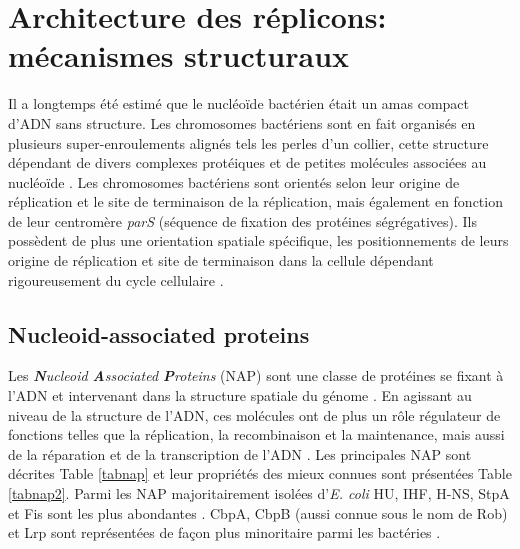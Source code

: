 \section{Architecture des réplicons: mécanismes structuraux}\label{spatial}
	Il a longtemps été estimé que le nucléoïde bactérien était un amas compact d'ADN sans structure. Les chromosomes bactériens sont en fait organisés en plusieurs super-enroulements alignés tels les perles d'un collier, cette structure dépendant de divers complexes protéiques et de petites molécules associées au nucléoïde \citep{thanbichler2010}. Les chromosomes bactériens sont orientés selon leur origine de réplication et le site de terminaison de la réplication, mais également en fonction de leur centromère \textit{parS} (séquence de fixation des protéines ségrégatives). Ils possèdent de plus une orientation spatiale spécifique, les positionnements de leurs origine de réplication et site de terminaison dans la cellule dépendant rigoureusement du cycle cellulaire \citep{Toro2010}.\\

	
\subsection{Nucleoid-associated proteins}  
	Les \textit{\textbf{N}ucleoid \textbf{A}ssociated \textbf{P}roteins} (NAP) sont une classe de protéines se fixant à l'ADN et intervenant dans la structure spatiale du génome \citep{Dillon2010}. En agissant au niveau de la structure de l'ADN, ces molécules ont de plus un rôle régulateur de fonctions telles que la réplication, la recombinaison et la maintenance, mais aussi de la réparation et de la transcription de l'ADN \citep{azam1999twelve}. Les principales NAP sont décrites Table \ref{tabnap} et leur propriétés des mieux connues sont présentées Table \ref{tabnap2}. Parmi les NAP majoritairement isolées d'\textit{E. coli} HU, IHF, H-NS, StpA et Fis sont les plus abondantes \citep{Johnson2005a}. CbpA, CbpB (aussi connue sous le nom de Rob) et Lrp sont représentées de façon plus minoritaire parmi les bactéries \citep{Johnson2005a}. 
	  
